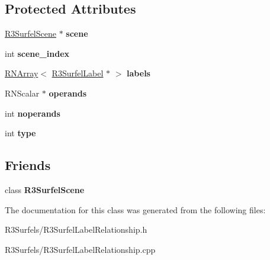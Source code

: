 \subsection*{Protected Attributes}
\begin{DoxyCompactItemize}
\item 
\hyperlink{class_r3_surfel_scene}{R3\+Surfel\+Scene} $\ast$ {\bfseries scene}\hypertarget{class_r3_surfel_label_relationship_a37162c1d65f359c56d635746480c0a88}{}\label{class_r3_surfel_label_relationship_a37162c1d65f359c56d635746480c0a88}

\item 
int {\bfseries scene\+\_\+index}\hypertarget{class_r3_surfel_label_relationship_a90cd20a53bfe23faf32b1ef5765c8cf4}{}\label{class_r3_surfel_label_relationship_a90cd20a53bfe23faf32b1ef5765c8cf4}

\item 
\hyperlink{class_r_n_array}{R\+N\+Array}$<$ \hyperlink{class_r3_surfel_label}{R3\+Surfel\+Label} $\ast$ $>$ {\bfseries labels}\hypertarget{class_r3_surfel_label_relationship_a4106c48cc0af8bebda19e7deea3d9cb0}{}\label{class_r3_surfel_label_relationship_a4106c48cc0af8bebda19e7deea3d9cb0}

\item 
R\+N\+Scalar $\ast$ {\bfseries operands}\hypertarget{class_r3_surfel_label_relationship_a11cab2631979a169053125d646a1945f}{}\label{class_r3_surfel_label_relationship_a11cab2631979a169053125d646a1945f}

\item 
int {\bfseries noperands}\hypertarget{class_r3_surfel_label_relationship_af792472e0e6b63d0e16698d4c45bed48}{}\label{class_r3_surfel_label_relationship_af792472e0e6b63d0e16698d4c45bed48}

\item 
int {\bfseries type}\hypertarget{class_r3_surfel_label_relationship_a9300116969a70b5e7255ff5855911fc3}{}\label{class_r3_surfel_label_relationship_a9300116969a70b5e7255ff5855911fc3}

\end{DoxyCompactItemize}
\subsection*{Friends}
\begin{DoxyCompactItemize}
\item 
class {\bfseries R3\+Surfel\+Scene}\hypertarget{class_r3_surfel_label_relationship_af9bb32c0eac7d1d54787bbc6b44586b6}{}\label{class_r3_surfel_label_relationship_af9bb32c0eac7d1d54787bbc6b44586b6}

\end{DoxyCompactItemize}


The documentation for this class was generated from the following files\+:\begin{DoxyCompactItemize}
\item 
R3\+Surfels/R3\+Surfel\+Label\+Relationship.\+h\item 
R3\+Surfels/R3\+Surfel\+Label\+Relationship.\+cpp\end{DoxyCompactItemize}
